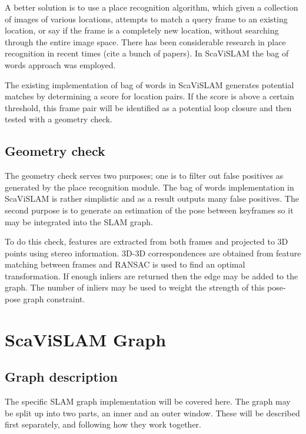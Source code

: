 A better solution is to use a place recognition algorithm, which given a collection of images of various locations, attempts to match a query frame to an existing location, or say if the frame is a completely new location, without searching through the entire image space.  There has been considerable research in place recognition in recent times (cite a bunch of papers).  In ScaViSLAM the bag of words approach was employed.


The existing implementation of bag of words in ScaViSLAM generates potential matches by determining a score for location pairs.  If the score is above a certain threshold, this frame pair will be identified as a potential loop closure and then tested with a geometry check.

\subsection{Geometry check}
\label{subsec:geometry_check}

The geometry check serves two purposes; one is to filter out false positives as generated by the place recognition module.  The bag of words implementation in ScaViSLAM is rather simplistic and as a result outputs many false positives.  The second purpose is to generate an estimation of the pose between keyframes so it may be integrated into the SLAM graph.  

To do this check, features are extracted from both frames and projected to 3D points using stereo information.  3D-3D correspondences are obtained from feature matching between frames and RANSAC is used to find an optimal transformation.  If enough inliers are returned then the edge may be added to the graph.  The number of inliers may be used to weight the strength of this pose-pose graph constraint.

\section{ScaViSLAM Graph}
\label{sec:scavislam_graph}

\subsection{Graph description}

The specific SLAM graph implementation will be covered here.  The graph may be split up into two parts, an inner and an outer window.  These will be described first separately, and following how they work together.

